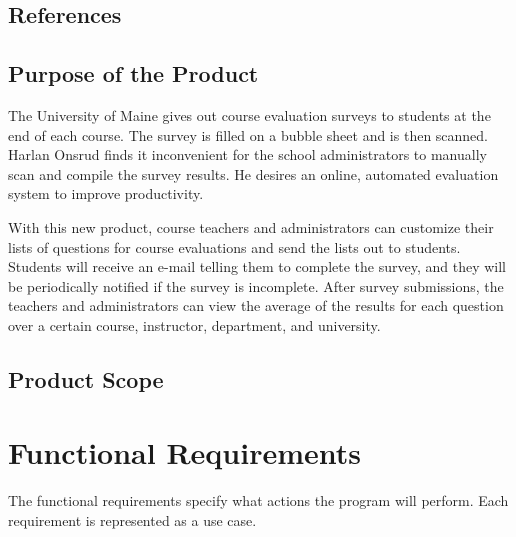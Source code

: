 \documentclass{article}
\begin{document}
\subsection{References}
\subsection{Purpose of the Product}

The University of Maine gives out course evaluation surveys to students at the end of each course. The survey is filled on a bubble sheet and is then scanned. Harlan Onsrud finds it inconvenient for the school administrators to manually scan and compile the survey results. He desires an online, automated evaluation system to improve productivity.\par

With this new product, course teachers and administrators can customize their lists of questions for course evaluations and send the lists out to students. Students will receive an e-mail telling them to complete the survey, and they will be periodically notified if the survey is incomplete. After survey submissions, the teachers and administrators can view the average of the results for each question over a certain course, instructor, department, and university.

\subsection{Product Scope}

\section{Functional Requirements}

The functional requirements specify what actions the program will perform. Each requirement is represented as a use case.
\end{document}
